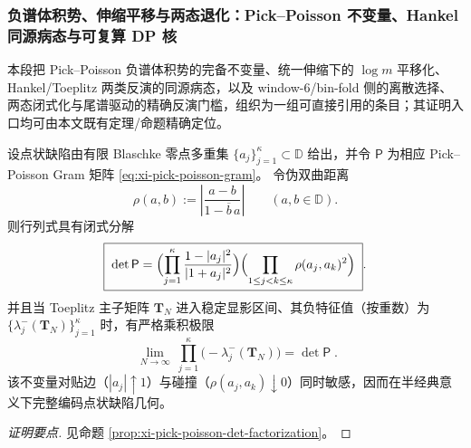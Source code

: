 \subsubsection{负谱体积势、伸缩平移与两态退化：Pick--Poisson 不变量、Hankel 同源病态与可复算 DP 核}
本段把 Pick--Poisson 负谱体积势的完备不变量、统一伸缩下的 \(\log m\) 平移化、Hankel/Toeplitz 两类反演的同源病态，以及 window-\(6\)/bin-fold 侧的离散选择、两态闭式化与尾谱驱动的精确反演门槛，组织为一组可直接引用的条目；其证明入口均可由本文既有定理/命题精确定位。

\begin{conclusion}\label{con:xi-terminal-negative-spectrum-det-invariant}
设点状缺陷由有限 Blaschke 零点多重集 \(\{a_j\}_{j=1}^{\kappa}\subset\mathbb{D}\) 给出，并令 \(\mathsf P\) 为相应 Pick--Poisson Gram 矩阵 \eqref{eq:xi-pick-poisson-gram}。
令伪双曲距离
\[
\rho(a,b):=\left|\frac{a-b}{1-\overline b\,a}\right|\qquad(a,b\in\mathbb{D}).
\]
则行列式具有闭式分解
\[
\boxed{\;
\det\mathsf P
=
\Bigl(\prod_{j=1}^{\kappa}\frac{1-|a_j|^2}{|1+a_j|^2}\Bigr)
\Bigl(\prod_{1\le j<k\le\kappa}\rho(a_j,a_k)^2\Bigr)\; }.
\]
并且当 Toeplitz 主子矩阵 \(\mathbf{T}_N\) 进入稳定显影区间、其负特征值（按重数）为 \(\{\lambda_j^{-}(\mathbf{T}_N)\}_{j=1}^{\kappa}\) 时，有严格乘积极限
\[
\boxed{\;
\lim_{N\to\infty}\ \prod_{j=1}^{\kappa}\bigl(-\lambda_j^{-}(\mathbf{T}_N)\bigr)=\det\mathsf P\; }.
\]
该不变量对贴边（\(|a_j|\uparrow 1\)）与碰撞（\(\rho(a_j,a_k)\downarrow 0\)）同时敏感，因而在半经典意义下完整编码点状缺陷几何。
\end{conclusion}
\begin{proof}[证明要点]
见命题 \ref{prop:xi-pick-poisson-det-factorization}。
\end{proof}

